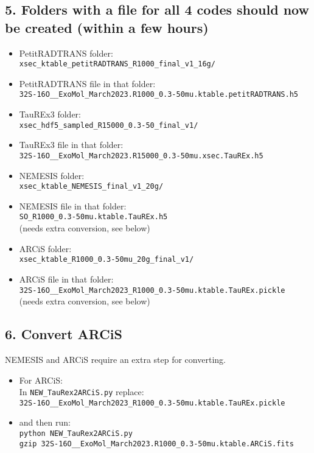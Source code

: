 \documentclass{article}
\begin{document}
\subsection*{5. Folders with a file for all 4 codes should now be created (within a few hours)}

\begin{itemize}
\item PetitRADTRANS folder: \\
\verb|xsec_ktable_petitRADTRANS_R1000_final_v1_16g/|
\item PetitRADTRANS file in that folder: \\
\verb|32S-16O__ExoMol_March2023.R1000_0.3-50mu.ktable.petitRADTRANS.h5|
\item TauREx3 folder: \\
\verb|xsec_hdf5_sampled_R15000_0.3-50_final_v1/|
\item TauREx3 file in that folder: \\
\verb|32S-16O__ExoMol_March2023.R15000_0.3-50mu.xsec.TauREx.h5|
\item NEMESIS folder: \\
\verb|xsec_ktable_NEMESIS_final_v1_20g/|
\item NEMESIS file in that folder: \\
\verb|SO_R1000_0.3-50mu.ktable.TauREx.h5| \\ (needs extra conversion, see below)
\item ARCiS folder: \\
\verb|xsec_ktable_R1000_0.3-50mu_20g_final_v1/|
\item ARCiS file in that folder: \\
\verb|32S-16O__ExoMol_March2023_R1000_0.3-50mu.ktable.TauREx.pickle| \\ (needs extra conversion, see below)
\end{itemize}

\subsection*{6. Convert ARCiS}
NEMESIS and ARCiS require an extra step for converting. 

\begin{itemize}
\item For ARCiS: \\
In \verb|NEW_TauRex2ARCiS.py| replace:\\
\verb|32S-16O__ExoMol_March2023_R1000_0.3-50mu.ktable.TauREx.pickle|
\item and then run: \\
 \verb|python NEW_TauRex2ARCiS.py| \\
\verb|gzip 32S-16O__ExoMol_March2023.R1000_0.3-50mu.ktable.ARCiS.fits|
\end{itemize}
\end{document}
